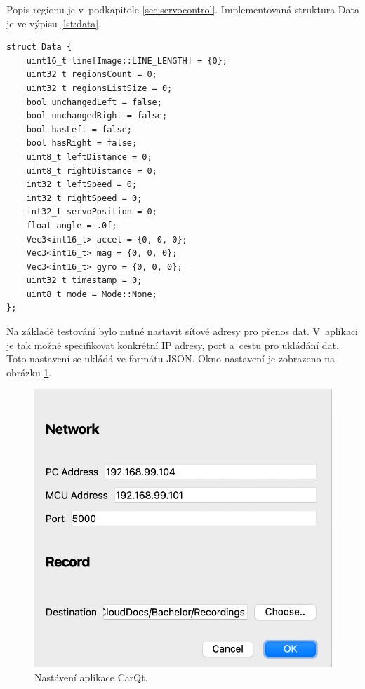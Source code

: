 Popis regionu je v~podkapitole \ref{sec:servocontrol}.
Implementovaná struktura Data je ve výpisu \ref{lst:data}.
\begin{lstlisting}[caption = Struktura Data., label = lst:data]
struct Data {
    uint16_t line[Image::LINE_LENGTH] = {0};
    uint32_t regionsCount = 0;
    uint32_t regionsListSize = 0;
    bool unchangedLeft = false;
    bool unchangedRight = false;
    bool hasLeft = false;
    bool hasRight = false;
    uint8_t leftDistance = 0;
    uint8_t rightDistance = 0;
    int32_t leftSpeed = 0;
    int32_t rightSpeed = 0;
    int32_t servoPosition = 0;
    float angle = .0f;
    Vec3<int16_t> accel = {0, 0, 0};
    Vec3<int16_t> mag = {0, 0, 0};
    Vec3<int16_t> gyro = {0, 0, 0};
    uint32_t timestamp = 0;
    uint8_t mode = Mode::None;
};
\end{lstlisting}

Na základě testování bylo nutné nastavit síťové adresy pro přenos dat. V~aplikaci je tak možné specifikovat konkrétní IP adresy, port a~cestu pro ukládání dat. Toto nastavení se ukládá ve formátu JSON. Okno nastavení je zobrazeno na obrázku \ref{fig:CarQtSettings}.
\begin{figure}[!h]
\centering
    \includegraphics[width = .5\linewidth]{Figures/SettingsWindow.png}
\caption{Nastávení aplikace CarQt.}
\label{fig:CarQtSettings}
\end{figure}

\endinput